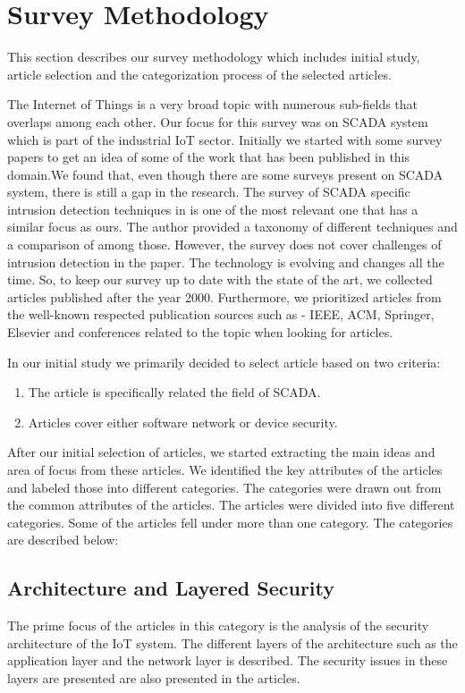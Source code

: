 \documentclass[letterpaper, 10 pt, conference]{ieeeconf}  %
\begin{document}
\section{Survey Methodology}
This section describes our survey methodology which includes initial study, article selection and the categorization process of the selected articles.

The Internet of Things is a very broad topic with numerous sub-fields that overlaps among each other. Our focus for this survey was on SCADA system which is part of the industrial IoT sector. Initially we started with some survey papers to get an idea of some of the work that has been published in this domain.We found that, even though there are some surveys present on SCADA system, there is still a gap in the research. The survey of SCADA specific intrusion detection techniques in \cite{c34} is one of the most relevant one that has a similar focus as ours. The author provided a taxonomy of different techniques and a comparison of among those. However, the survey does not cover challenges of intrusion detection in the paper. The technology is evolving and changes all the time. So, to keep our survey up to date with the state of the art, we collected articles published after the year 2000. Furthermore, we prioritized articles from the well-known respected publication sources such as - IEEE, ACM, Springer, Elsevier and conferences related to the topic when looking for articles. 

In our initial study we primarily decided to select article based on two criteria:
\begin{enumerate}
\item The article is specifically related the field of SCADA.
\item Articles cover either software network or device security.

\end{enumerate}

After our initial selection of articles, we started extracting the main ideas and area of focus from these articles. We identified the key attributes of the articles and labeled those into different categories. The categories were drawn out from the common attributes of the articles. The articles were divided into five different categories. Some of the articles fell under more than one category. The categories are described below:

\subsection{Architecture and Layered Security}
The prime focus of the articles in this category is the analysis of the security architecture of the IoT system. The different layers of the architecture such as the application layer and the network layer is described. The security issues in these layers are presented are also presented in the articles.
\end{document}
